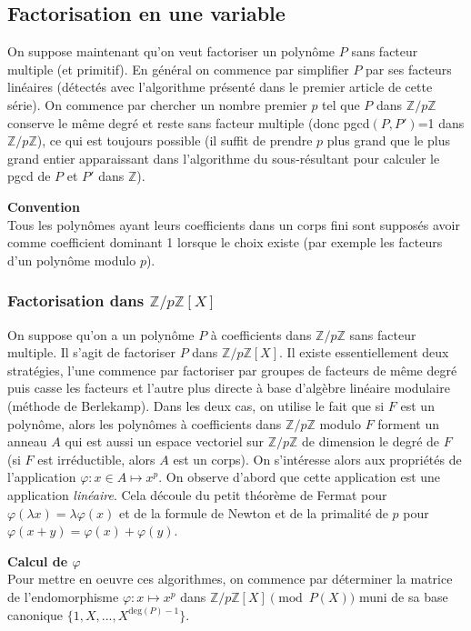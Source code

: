 \documentclass[a4paper,11pt]{article}
\newcommand{\Z}{{\mathbb{Z}}}
\begin{document}
\begin{giacjshere}
\subsection{Factorisation en une variable}
On suppose maintenant qu'on veut factoriser un polynôme $P$ sans facteur
multiple (et primitif). En général on commence par simplifier $P$ par
ses facteurs linéaires (détectés avec l'algorithme présenté dans le
premier article de cette série). On commence par chercher un nombre premier $p$
tel que $P$ dans $\Z/p\Z$ conserve le même degré et reste sans facteur 
multiple (donc pgcd$(P,P')$=1 dans $\Z/p\Z$), ce qui est toujours
possible (il suffit de prendre $p$ plus grand que le plus grand entier 
apparaissant dans l'algorithme du sous-résultant pour calculer
le pgcd de $P$ et $P'$ dans $\Z$).

{\bf Convention}\\
Tous les polynômes ayant leurs coefficients dans un corps fini sont
supposés avoir comme coefficient dominant 1 lorsque le choix
existe (par exemple les facteurs d'un polynôme modulo $p$).

\subsubsection{Factorisation dans $\Z/p\Z[X]$}
On suppose qu'on a un polynôme $P$ à coefficients dans $\Z/p\Z$ sans
facteur multiple. Il s'agit de factoriser $P$ dans $\Z/p\Z[X]$.
Il existe essentiellement deux stratégies, l'une commence par factoriser par
groupes de facteurs de même degré puis casse les facteurs et l'autre 
plus directe à base d'algèbre linéaire modulaire (méthode de Berlekamp). 
Dans les deux cas, on utilise le fait que si $F$ est un polynôme, 
alors les polynômes à coefficients dans $\Z/p\Z$
modulo $F$ forment un anneau $A$ qui est aussi un espace vectoriel 
sur $\Z/p\Z$ de dimension le degré de $F$ 
(si $F$ est irréductible, alors $A$ est un corps).
On s'intéresse alors aux propriétés de l'application 
$\varphi: x \in A \mapsto x^p$.
On observe d'abord que cette application est une application {\em linéaire\/}.
Cela découle du petit théorème de Fermat pour $\varphi(\lambda x)=\lambda
\varphi(x)$ et de la formule de Newton et de la primalité de $p$ pour
$\varphi(x+y)=\varphi(x)+\varphi(y)$.

{\bf Calcul de $\varphi$}\\
Pour mettre en oeuvre ces algorithmes, on commence par déterminer la matrice
de l'endomorphisme $\varphi: x \mapsto x^p$ dans $\Z/p\Z[X] \pmod {P(X)}$
muni de sa base canonique $\{ 1, X,...,X^{\mbox{deg}(P)-1} \}$.


\end{giacjshere}
\end{document}
